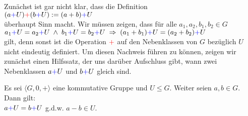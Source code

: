 \remark
Zun\"{a}chst ist gar nicht klar, dass die Definition
\\[0.2cm]
\hspace*{1.3cm}
  $(a {\color{blue}{+}} U) {\color{red}{+}} (b {\color{blue}{+}} U) := (a + b) {\color{blue}{+}} U$
\\[0.2cm]
\"{u}berhaupt Sinn macht.  Wir m\"{u}ssen zeigen, dass f\"{u}r alle $a_1,a_2, b_1, b_2 \in G$
\\[0.2cm]
\hspace*{1.3cm}
$a_1 {\color{blue}{+}} U = a_2 {\color{blue}{+}} U \;\wedge\; b_1 {\color{blue}{+}} U = b_2 {\color{blue}{+}} U \;\Rightarrow\; (a_1 + b_1) {\color{blue}{+}} U = (a_2 + b_2) {\color{blue}{+}} U$
\\[0.2cm]
gilt, denn sonst ist die Operation ${\color{red}{+}}$ auf den Nebenklassen von $G$ bez\"{u}glich $U$ nicht eindeutig
definiert.  Um diesen Nachweis f\"{u}hren zu k\"{o}nnen, zeigen wir zun\"{a}chst einen Hilfssatz, der uns dar\"{u}ber
Aufschluss gibt, wann zwei Nebenklassen $a {\color{blue}{+}} U$ und $b {\color{blue}{+}} U$ gleich sind.
\eoxs

\begin{Lemma}
  Es sei $\langle G, 0, + \rangle$ eine {\color{red}kommutative} Gruppe und $U \leq G$.
  Weiter seien $a,b \in G$.  Dann gilt:
  \\[0.2cm]
  \hspace*{1.3cm}
  $a {\color{blue}{+}} U = b {\color{blue}{+}} U$ \quad g.d.w. \quad $a - b \in U$.
\end{Lemma}

